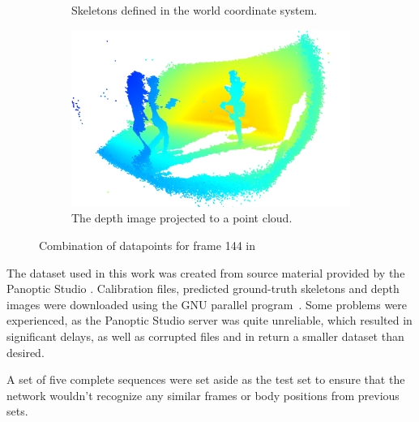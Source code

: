 \begin{figure}
\begin{subfigure}{.4\textwidth}
    \caption{Skeletons defined in the world coordinate system.}
    \label{fig:dataset_skeletons}
  \end{subfigure}%
  \newline
  \begin{subfigure}{.7\textwidth}
    \centering
    \includegraphics[width=\linewidth]{img/pointcloud}
    \caption{The depth image projected to a point cloud.}
    \label{fig:dataset_skeletons}
  \end{subfigure}%
  \caption{Combination of datapoints for frame 144 in \cite{Joo_2015_ICCV}}
  \label{fig:skeleton_depth_duo}
\end{figure}

The dataset used in this work was created from source material provided by the Panoptic Studio \cite{Joo_2015_ICCV, Joo_2017_TPAMI}. Calibration files, predicted ground-truth skeletons and depth images were downloaded using the GNU parallel program~\cite{Tange2011a}. Some problems were experienced, as the Panoptic Studio server was quite unreliable, which resulted in significant delays, as well as corrupted files and in return a smaller dataset than desired.

A set of five complete sequences were set aside as the test set to ensure that the network wouldn't recognize any similar frames or body positions from previous sets.


